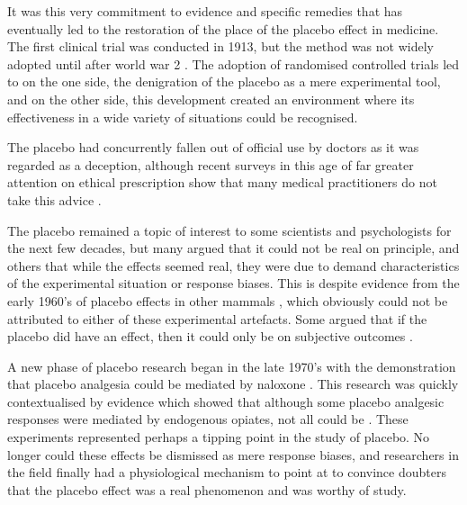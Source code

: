 It was this very commitment to evidence and specific remedies that has eventually led to the restoration of the place of the placebo effect in medicine. The first clinical trial was conducted in 1913, but the method was not widely adopted until after world war 2 \cite{Kaptchuk1998}. The adoption of randomised controlled trials led to on the one side, the denigration of the placebo as a mere experimental tool, and on the other side, this development created an environment where its effectiveness in a wide variety of situations could be recognised. 

The placebo had concurrently fallen out of official use  by doctors as it was regarded as a deception, although recent surveys in this age of far greater attention on ethical prescription show that many medical practitioners do not take this advice \cite{hrobjartsson2003use,sherman2008academic,tilburt2008prescribing,Sherman2008,Sherman2008a,Sherman2008b,Sherman2003,Ross1983,Buckalew1981,Krugman1964,Ross1962}. 


The placebo remained a topic of interest to some scientists and psychologists for the next few decades, but many argued that it could not be real on principle, and others that while the effects seemed real, they were due to demand characteristics of the experimental situation or response biases. %
This is despite evidence from the early 1960's of placebo effects in other mammals \cite{Herrnstein1962}, which obviously could not be attributed to either of these experimental artefacts. Some argued that if the placebo did have an effect, then it could only be on subjective outcomes \cite{Hrobjartsson2001}.

A new phase of placebo research began in the late 1970's with the demonstration that placebo analgesia could be mediated by naloxone \cite{Levine1978a,Levine1984,Fields1981,Gordon1981,Levine1979}. This research was quickly contextualised by evidence which showed that although some placebo analgesic responses were mediated by endogenous opiates, not all could be \cite{Gracely1983,Levine1984}. These experiments represented perhaps a tipping point in the study of placebo. No longer could these effects be dismissed as mere response biases, and researchers in the field finally had a physiological mechanism to point at to convince doubters that the placebo effect was a real phenomenon and was worthy of study. 

